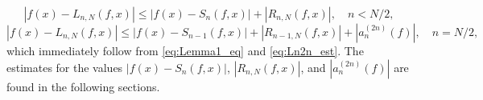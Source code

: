 \begin{equation}
\left|f(x)-L_{n,N}(f,x)\right|\leq\left|f(x)-S_{n}(f,x)\right|+\left|R_{n,N}(f,x)\right|,\quad n<N/2,\label{eq:Th_est1}
\end{equation}
\begin{equation}
\left|f(x)-L_{n,N}(f,x)\right|\leq
\left|f(x)-S_{n-1}(f,x)\right|+\left|R_{n-1,N}(f,x)\right|+\left|a_{n}^{(2n)}(f)\right|,\quad n=N/2\label{eq:Th_est_2},
\end{equation}
which immediately follow from \eqref{eq:Lemma1_eq} and \eqref{eq:Ln2n_est}.
The estimates for the values $\left|f(x)-S_{n}(f,x)\right|$, $\left|R_{n,N}(f,x)\right|$, and $|a_{n}^{(2n)}(f)|$ are found in the following sections.

